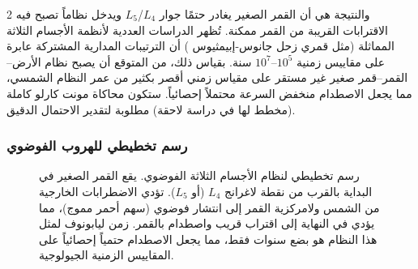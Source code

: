 \documentclass[11pt,a4paper]{article}
\begin{document}
\begin{multicols}{2}
		والنتيجة هي أن القمر الصغير يغادر حتمًا جوار \(L_4\)/\(L_5\) ويدخل نظاماً تصبح فيه الاقترابات القريبة من القمر ممكنة. تُظهر الدراسات العددية لأنظمة الأجسام الثلاثة المماثلة (مثل قمري زحل جانوس-إبيمثيوس \cite{JanusEpimetheus}) أن الترتيبات المدارية المشتركة عابرة على مقاييس زمنية \(10^{5}\)–\(10^{7}\) سنة. بقياس ذلك، من المتوقع أن يصبح نظام الأرض–القمر–قمر صغير غير مستقر على مقياس زمني أقصر بكثير من عمر النظام الشمسي، مما يجعل الاصطدام منخفض السرعة محتملاً إحصائياً. ستكون محاكاة مونت كارلو كاملة (مخطط لها في دراسة لاحقة) مطلوبة لتقدير الاحتمال الدقيق.
		
		\subsubsection{رسم تخطيطي للهروب الفوضوي}
		\begin{figure}[H]
			\centering
			\caption{رسم تخطيطي لنظام الأجسام الثلاثة الفوضوي. يقع القمر الصغير في البداية بالقرب من نقطة لاغرانج \(L_4\) (أو \(L_5\)). تؤدي الاضطرابات الخارجية من الشمس ولامركزية القمر إلى انتشار فوضوي (سهم أحمر مموج)، مما يؤدي في النهاية إلى اقتراب قريب واصطدام بالقمر. زمن ليابونوف لمثل هذا النظام هو بضع سنوات فقط، مما يجعل الاصطدام حتمياً إحصائياً على المقاييس الزمنية الجيولوجية.}
			\label{fig:threebody}
		\end{figure}
		

\end{multicols}
\end{document}
